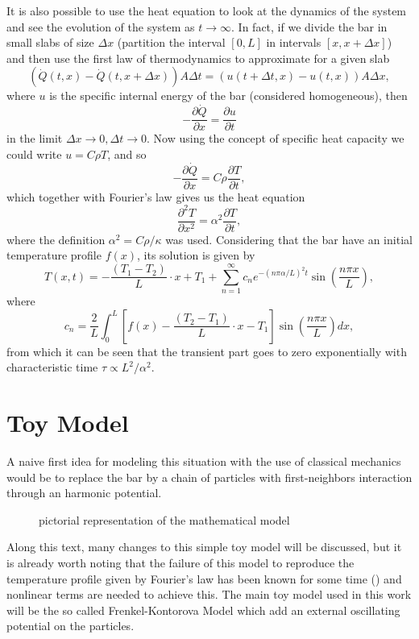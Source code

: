 It is also possible to use the heat equation to look at the dynamics of the system and see the evolution of the system as $ t\to \infty $. In fact, if we divide the bar in small slabs of size $ \Delta x $ (partition the interval $ [0,L] $ in intervals $ [x,x+\Delta x] $) and then use the first law of thermodynamics to approximate for a given slab
\[ 
	(\dot{Q}(t,x) - \dot{Q}(t,x+\Delta x))A\Delta t = 
	(u(t+\Delta t,x) - u(t,x)) A \Delta x,
\]
where $ u $ is the specific internal energy of the bar (considered homogeneous), then
\[ 
	-\frac{\partial \dot{Q}}{\partial x} = 
	\frac{\partial u }{\partial t}
 \]
in the limit $ \Delta x\to 0, \Delta t\to 0$. Now using the concept of specific heat capacity we could write $ u = C\rho T $, and so
\[ 
	-\frac{\partial \dot{Q}}{\partial x} = 
	C \rho \frac{\partial T }{\partial t},
 \]
which together with Fourier's law gives us the heat equation
\[ 
	\frac{\partial^{2} T}{\partial x^{2}} = 
	\alpha^{2} \frac{\partial T }{\partial t},
\]
where the definition $ \alpha^{2} = C \rho / \kappa $ was used. Considering that the bar have an initial temperature profile $ f(x) $, its solution is given by
\[ 
	T(x,t) = - \frac{(T_{1} - T_{2})}{L}\cdot x + T_{1} +
	\sum_{n=1}^{\infty} c_{n} e^{-(n\pi\alpha/L)^{2} t}
	\sin \left( \frac{n\pi x}{L} \right),
\]
where
\[ 
	c_{n} = \frac{2 }{L }\int_{0}^{L} 
	\left[ f(x) - \frac{(T_{2} - T_{1})}{L}\cdot x - T_{1}\right]
	\sin \left(\frac{n\pi x }{L}\right)dx,
 \]
from which it can be seen that the transient part goes to zero exponentially with characteristic time $ \tau \propto L^{2}/\alpha^{2} $.

\section{Toy Model}

A naive first idea for modeling this situation with the use of classical mechanics would be to replace the bar by a chain of particles with first-neighbors interaction through an harmonic potential.

\begin{figure}[H] 
		\centering 
		\fontsize{18}{14} 
		\label{ch2_3} 
		\caption{pictorial representation of the mathematical model}
\end{figure} 

Along this text, many changes to this simple toy model will be discussed, but it is already worth noting that the failure of this model to reproduce the temperature profile given by Fourier's law has been known for some time (\cite{riederPropertiesHarmonic1967}) and nonlinear terms are needed to achieve this. The main toy model used in this work will be the so called Frenkel-Kontorova Model which add an external oscillating potential on the particles. 

